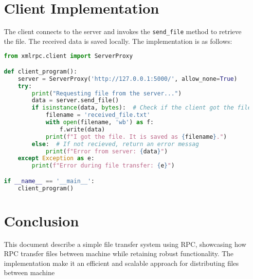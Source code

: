 \documentclass[12pt]{article}
\begin{document}
\section{Client Implementation}
The client connects to the server and invokes the \texttt{send\_file} method to retrieve the file. The received data is saved locally. The implementation is as follows:

\begin{lstlisting}[language=Python, caption=Client Implementation]
from xmlrpc.client import ServerProxy

def client_program():
    server = ServerProxy('http://127.0.0.1:5000/', allow_none=True)
    try:
        print("Requesting file from the server...")
        data = server.send_file()
        if isinstance(data, bytes):  # Check if the client got the file or not
            filename = 'received_file.txt'
            with open(filename, 'wb') as f:
                f.write(data)
            print(f"I got the file. It is saved as {filename}.")
        else:  # If not recieved, return an error messag
            print(f"Error from server: {data}")
    except Exception as e:
        print(f"Error during file transfer: {e}")

if __name__ == '__main__':
    client_program()

\end{lstlisting}

\section{Conclusion}
This document describe a simple file transfer system using RPC, showcasing how RPC transfer files between machine while retaining robust functionality. The implementation make it an efficient and scalable approach for distributing files between machine
\end{document}
